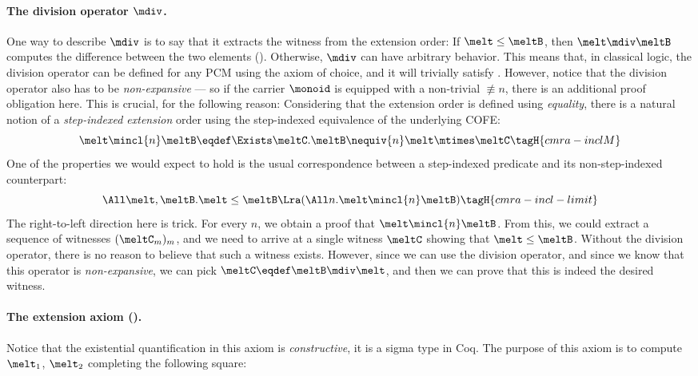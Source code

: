 \paragraph{The division operator $\mdiv$.}
One way to describe $\mdiv$ is to say that it extracts the witness from the extension order: If $\melt \leq \meltB$, then $\melt \mdiv \meltB$ computes the difference between the two elements ().
Otherwise, $\mdiv$ can have arbitrary behavior.
This means that, in classical logic, the division operator can be defined for any PCM using the axiom of choice, and it will trivially satisfy .
However, notice that the division operator also has to be \emph{non-expansive} --- so if the carrier $\monoid$ is equipped with a non-trivial $\nequiv{n}$, there is an additional proof obligation here.
This is crucial, for the following reason:
Considering that the extension order is defined using \emph{equality}, there is a natural notion of a \emph{step-indexed extension} order using the step-indexed equivalence of the underlying COFE:
\[ \melt \mincl{n} \meltB \eqdef \Exists \meltC. \meltB \nequiv{n} \melt \mtimes \meltC \tagH{cmra-inclM} \]
One of the properties we would expect to hold is the usual correspondence between a step-indexed predicate and its non-step-indexed counterpart:
\[ \All \melt, \meltB. \melt \leq \meltB \Lra (\All n. \melt \mincl{n} \meltB) \tagH{cmra-incl-limit} \]
The right-to-left direction here is trick.
For every $n$, we obtain a proof that $\melt \mincl{n} \meltB$.
From this, we could extract a sequence of witnesses $(\meltC_m)_{m}$, and we need to arrive at a single witness $\meltC$ showing that $\melt \leq \meltB$.
Without the division operator, there is no reason to believe that such a witness exists.
However, since we can use the division operator, and since we know that this operator is \emph{non-expansive}, we can pick $\meltC \eqdef \meltB \mdiv \melt$, and then we can prove that this is indeed the desired witness.

\paragraph{The extension axiom ().}
Notice that the existential quantification in this axiom is \emph{constructive}, \ie it is a sigma type in Coq.
The purpose of this axiom is to compute $\melt_1$, $\melt_2$ completing the following square:

